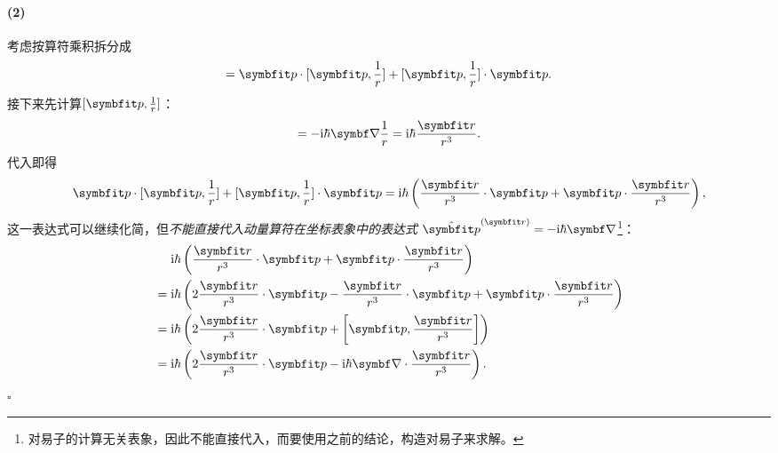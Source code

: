 \begin{tcolorbox}[breakable, title={\textbf{例题：两个对易子的计算}}]
    \paragraph{(2)}
    考虑按算符乘积拆分成
    \begin{equation}
        [p^2,\frac{1}{r}] = \pp\cdot[\pp,\frac{1}{r}] + [\pp,\frac{1}{r}]\cdot\pp.
    \end{equation}
    接下来先计算$[\pp,\frac{1}{r}]$：
    \begin{equation}
        [\pp,\frac{1}{r}] = -\ii\hbar\del\frac{1}{r} = \ii\hbar\frac{\rr}{r^3}.
    \end{equation}
    代入即得
    \begin{equation}
        \pp\cdot[\pp,\frac{1}{r}] + [\pp,\frac{1}{r}]\cdot\pp = \ii\hbar\left( \frac{\rr}{r^3}\cdot\pp+\pp\cdot\frac{\rr}{r^3} \right),
    \end{equation}
    这一表达式可以继续化简，但\emph{不能直接代入动量算符在坐标表象中的表达式} $\hat{\pp}^{(\rr)}=-\ii\hbar\del$\footnote{对易子的计算无关表象，因此不能直接代入，而要使用之前的结论，构造对易子来求解。}：
    \begin{equation}
    \begin{aligned}
        &\quad\ \ii\hbar\left( \frac{\rr}{r^3}\cdot\pp+\pp\cdot\frac{\rr}{r^3} \right) \\
        &= \ii\hbar\left( 2\frac{\rr}{r^3}\cdot\pp - \frac{\rr}{r^3}\cdot\pp +\pp\cdot\frac{\rr}{r^3} \right) \\
        &= \ii\hbar\left( 2\frac{\rr}{r^3}\cdot\pp + \left[\pp, \frac{\rr}{r^3}\right] \right) \\
        &= \ii\hbar\left( 2\frac{\rr}{r^3}\cdot\pp - \ii\hbar\del\cdot\frac{\rr}{r^3} \right).
    \end{aligned}
    \end{equation}
    \hfill$\square$

\end{tcolorbox}

